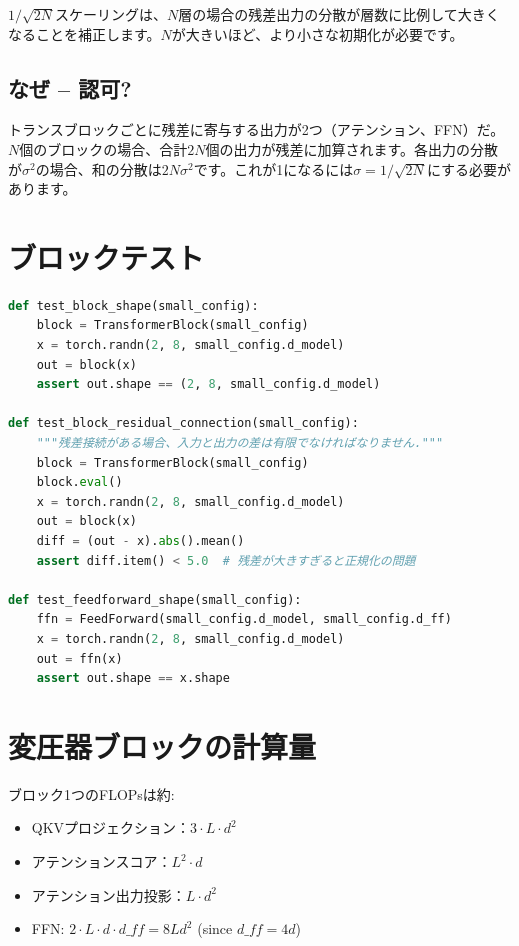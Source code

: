 $1/\sqrt{2N}$スケーリングは、$N$層の場合の残差出力の分散が層数に比例して大きくなることを補正します。$N$が大きいほど、より小さな初期化が必要です。

\subsection{なぜ   --  認可?}

トランスブロックごとに残差に寄与する出力が2つ（アテンション、FFN）だ。$N$個のブロックの場合、合計$2N$個の出力が残差に加算されます。各出力の分散が$\sigma^2$の場合、和の分散は$2N \sigma^2$です。これが1になるには$\sigma = 1/\sqrt{2N}$にする必要があります。

\section{ブロックテスト}

\begin{lstlisting}[language=Python]
def test_block_shape(small_config):
    block = TransformerBlock(small_config)
    x = torch.randn(2, 8, small_config.d_model)
    out = block(x)
    assert out.shape == (2, 8, small_config.d_model)

def test_block_residual_connection(small_config):
    """残差接続がある場合、入力と出力の差は有限でなければなりません."""
    block = TransformerBlock(small_config)
    block.eval()
    x = torch.randn(2, 8, small_config.d_model)
    out = block(x)
    diff = (out - x).abs().mean()
    assert diff.item() < 5.0  # 残差が大きすぎると正規化の問題

def test_feedforward_shape(small_config):
    ffn = FeedForward(small_config.d_model, small_config.d_ff)
    x = torch.randn(2, 8, small_config.d_model)
    out = ffn(x)
    assert out.shape == x.shape
\end{lstlisting}

\section{変圧器ブロックの計算量}

ブロック1つのFLOPsは約:
\begin{itemize}
\item QKVプロジェクション：$3 \cdot L \cdot d^2$
\item アテンションスコア：$L^2 \cdot d$
\item アテンション出力投影：$L \cdot d^2$
  \item FFN: $2 \cdot L \cdot d \cdot d\_{ff} = 8 L d^2$ (since $d\_{ff} = 4d$)
\end{itemize}

